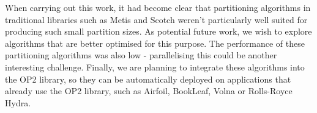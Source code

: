 When carrying out this work, it had become clear that partitioning algorithms in
traditional libraries such as Metis and Scotch weren't particularly well suited
for producing such small partition sizes. As potential future work, we wish to
explore algorithms that are better optimised for this purpose. The performance
of these partitioning algorithms was also low - parallelising this could be
another interesting challenge. Finally, we are planning to integrate these
algorithms into the OP2 library, so they can be automatically deployed on
applications that already use the OP2 library, such as Airfoil, BookLeaf, Volna
or Rolls-Royce Hydra.

